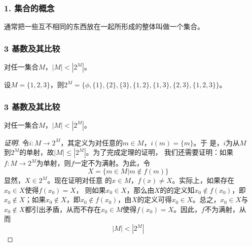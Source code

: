 \documentclass{beamer}
\begin{document}
\begin{CJK*}{UTF8}{gbsn}



\begin{frame}[t]
  \frametitle{1. 集合的概念}
  \begin{Defofset}
    通常把一些互不相同的东西放在一起所形成的整体叫做一个\alert{集合}。
  \end{Defofset}
\end{frame}



\begin{frame}[t]
  \frametitle{3 基数及其比较}
  \begin{Thm}[康托]
    对任一集合$M$，$|M| < |2^{M}|$。
  \end{Thm}
\pause
  设$M=\{1,2,3\}$，则$2^{M}=\{\phi,\{1\},\{2\},\{3\},\{1,2\},\{1,3\},\{2,3\},\{1,2,3\}\}$。
\end{frame}
\begin{frame}[t]
  \frametitle{3 基数及其比较}
  \begin{Thm}[康托]
    对任一集合$M$，$|M| < |2^{M}|$。
  \end{Thm}
  \begin{proof}[证明]
    令$i:M\to
    2^M$，其定义为对任意的$m\in M$，$i(m)=\{m\}$。于
    是，$i$为从$M$到$2^M$的单射，故$|M|\leq |2^M|$。为了完成定理的证明，
    我们还需要证明：如果$f:M\to 2^M$为单射，则$f$一定不为满射。为此，令
    \[X=\{m\in M|m \notin f(m)\}\]显然，$X\in 2^M$。现在证明对任意
    的$x\in M$，$f(x)\neq X$。实际上，如果存在$x_0\in X$使得$f(x_0)=X$，
    则如果$x_0\in X$，那么由$X$的的定义知$x_0\notin
    f(x_0)$，即$x_0\notin X$；如果$x_0\notin X$，即$x_0\notin f(x_0)$，由$X$的定义可得$x_0\in X$。总之，$x_0\in X$与$x_0\notin X$都引出矛盾，从而不存在$x_0\in M$使得$f(x_0)=X$。因此，$f$不为满射，从而
    \[|M|<|2^M|\]
  \end{proof}
\end{frame}


\end{CJK*}
\end{document}
